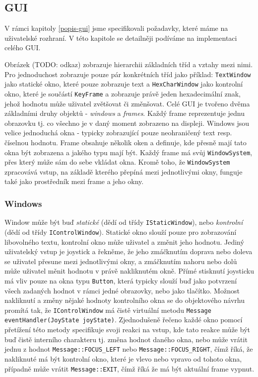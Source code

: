 
\subsection{GUI}

V rámci kapitoly \ref{popis-gui} jsme specifikovali požadavky, které máme na uživatelské
rozhraní.
V této kapitole se detailněji podíváme na implementaci celého GUI.


Obrázek (TODO: odkaz) zobrazuje hierarchii základních tříd a vztahy mezi nimi.
Pro jednoduchost zobrazuje pouze pár konkrétních tříd jako příklad: \texttt{TextWindow} jako statické
okno, které pouze zobrazuje text a \texttt{HexCharWindow} jako kontrolní okno, které je součástí
\texttt{KeyFrame} a zobrazuje právě jeden hexadecimální znak, jehož hodnotu může uživatel
zvětšovat či změnšovat.
Celé GUI je tvořeno dvěma základními druhy objektů - \emph{windows} a \emph{frames}.
Každý frame reprezentuje jednu obrazovku tj. co všechno je v daný moment zobrazeno na displeji.
Windows jsou velice jednoduchá okna - typicky zobrazující pouze neohraničený text resp. číselnou
hodnotu.
Frame obsahuje několik oken a definuje, kde přesně mají tato okna být zobrazena a jakého typu
mají být.
Každý frame má svůj \texttt{WindowSystem}, přes který může sám do sebe vkládat okna.
Kromě toho, že \texttt{WindowSystem} zpracovává vstup, na základě kterého přepíná mezi jednotlivými okny,
funguje také jako prostředník mezi frame a jeho okny.

\subsubsection{Windows}
Window může být buď \emph{statické} (dědí od třídy \texttt{IStaticWindow}), nebo \emph{kontrolní}
(dědí od třídy \texttt{IControlWindow}).
Statické okno slouží pouze pro zobrazování libovolného textu, kontrolní okno může uživatel 
a změnit jeho hodnotu.
Jediný uživatelský vstup je joystick a řekněme, že jeho zmáčknutím doprava nebo doleva se uživatel
přesune mezi jednotlivými okny, a zmáčknutím nahoru nebo dolů může uživatel měnit hodnotu
v právě nakliknutém okně.
Přímé stisknutí joysticku má vliv pouze na okna typu \texttt{Button}, která typicky slouží buď jako
potvrzení všech zadaných hodnot v rámci jedné obrazovky, nebo jako  tlačítko.
Možnost nakliknutí a změny nějaké hodnoty kontrolního okna se do objektového návrhu promítá tak,
že \texttt{IControlWindow} má čistě virtuální metodu \texttt{Message eventHandler(JoyState joyState)}.
Zjednodušeně řečeno každé okno pomocí přetížení této metody specifikuje svoji reakci na vstup,
kde tato reakce může být buď čistě interního charakteru tj. změna hodnot daného okna, nebo může
vrátit jednu z hodnot \texttt{Message::FOCUS\_LEFT} nebo \texttt{Message::FOCUS\_RIGHT}, čímž
říká, že nakliknuté má být kontrolní okno, které je vlevo nebo vpravo od tohoto okna, případně
může vrátit \texttt{Message::EXIT}, čímž říká že má být aktuální frame vypnut.

